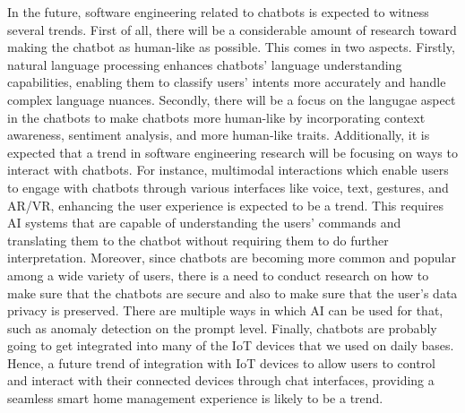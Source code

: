 \documentclass[10pt, a4paper]{article}
\begin{document}
In the future, software engineering related to chatbots is expected to witness several trends. First of all, there will be a considerable amount of research toward making the chatbot as human-like as possible. This comes in two aspects. Firstly, natural language processing enhances chatbots' language understanding capabilities, enabling them to classify users' intents more accurately and handle complex language nuances. Secondly, there will be a focus on the langugae aspect in the chatbots to make chatbots more human-like by incorporating context awareness, sentiment analysis, and more human-like traits.
Additionally, it is expected that a trend in software engineering research will be focusing on ways to interact with chatbots. For instance, multimodal interactions which enable users to engage with chatbots through various interfaces like voice, text, gestures, and AR/VR, enhancing the user experience is expected to be a trend. This requires AI systems that are capable of understanding the users' commands and translating them to the chatbot without requiring them to do further interpretation.
Moreover, since chatbots are becoming more common and popular among a wide variety of users, there is a need to conduct research on how to make sure that the chatbots are secure and also to make sure that the user's data privacy is preserved. There are multiple ways in which AI can be used for that, such as anomaly detection on the prompt level. 
Finally, chatbots are probably going to get integrated into many of the IoT devices that we used on daily bases. Hence, a future trend of integration with IoT devices to allow users to control and interact with their connected devices through chat interfaces, providing a seamless smart home management experience is likely to be a trend.



\newpage





\end{document}
